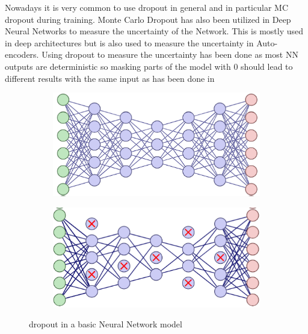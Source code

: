 Nowadays it is very common to use dropout in general and in particular MC dropout during training.
Monte Carlo Dropout has also been utilized in Deep Neural Networks to measure the uncertainty of the Network.   
This is mostly used in deep architectures but is also used to measure the uncertainty in Auto-encoders. \cite{gawlikowski2022surveyuncertaintydeepneural}
Using dropout to measure the uncertainty has been done as most NN outputs are deterministic so masking parts of the model with 0 should lead to different results with the same input as has been done in \cite{gal2016dropoutbayesianapproximationrepresenting}

\begin{figure}[ht]
    \centering
    \begin{subfigure}{0.45\textwidth}
        \includegraphics[width=\linewidth]{Latex//sections//images/nondropout.png}
    \end{subfigure}
    \begin{subfigure}{0.45\textwidth}
        \includegraphics[width=\linewidth]{Latex//sections//images/dropout.png}
    \end{subfigure}
    
    \caption{dropout in a basic Neural Network model}
    \label{fig:dropout}
\end{figure}

